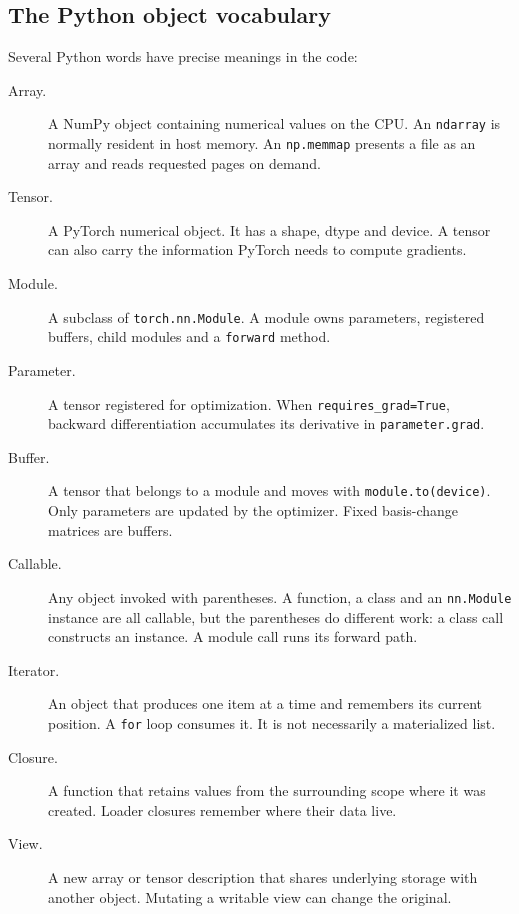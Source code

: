 \documentclass[10pt,aps,prd,twocolumn,nofootinbib]{revtex4-2}
\newcommand{\code}[1]{\texttt{#1}}
\begin{document}
\subsection{The Python object vocabulary}

Several Python words have precise meanings in the code:

\begin{description}
  \item[Array.] A NumPy object containing numerical values on the CPU.  An
  \code{ndarray} is normally resident in host memory.  An \code{np.memmap}
  presents a file as an array and reads requested pages on demand.

  \item[Tensor.] A PyTorch numerical object.  It has a shape, dtype and
  device.  A tensor can also carry the information PyTorch needs to compute
  gradients.

  \item[Module.] A subclass of \code{torch.nn.Module}.  A module owns
  parameters, registered buffers, child modules and a \code{forward} method.

  \item[Parameter.] A tensor registered for optimization.  When
  \code{requires\_grad=True}, backward differentiation accumulates its
  derivative in \code{parameter.grad}.

  \item[Buffer.] A tensor that belongs to a module and moves with
  \code{module.to(device)}.  Only parameters are updated by the optimizer.
  Fixed basis-change matrices are buffers.

  \item[Callable.] Any object invoked with parentheses.  A function, a class
  and an \code{nn.Module} instance are all callable, but the parentheses do
  different work: a class call constructs an instance.  A module call runs its
  forward path.

  \item[Iterator.] An object that produces one item at a time and remembers
  its current position.  A \code{for} loop consumes it.  It is not necessarily
  a materialized list.

  \item[Closure.] A function that retains values from the surrounding scope
  where it was created.  Loader closures remember where their data live.

  \item[View.] A new array or tensor description that shares underlying
  storage with another object.  Mutating a writable view can change the
  original.


\end{description}
\end{document}

